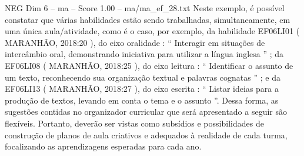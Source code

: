 \begin{textsample}{NEG Dim 6 – ma – Score 1.00 – ma/ma\_ef\_28.txt}
Neste exemplo, é possível constatar que várias habilidades estão sendo trabalhadas, simultaneamente, em uma única aula/atividade, como é o caso, por exemplo, da habilidade EF06LI01 ( MARANHÃO, 2018:20 ), do eixo oralidade : “ Interagir em situações de intercâmbio oral, demonstrando iniciativa para utilizar a língua inglesa ” ; da EF06LI08 ( MARANHÃO, 2018:25 ), do eixo leitura : “ Identificar o assunto de um texto, reconhecendo sua organização textual e palavras cognatas ” ; e da EF06LI13 ( MARANHÃO, 2018:27 ), do eixo escrita : “ Listar ideias para a produção de textos, levando em conta o tema e o assunto ”.
Dessa forma, as sugestões contidas no organizador curricular que será apresentado a seguir são flexíveis.
Portanto, deverão ser vistas como subsídios e possibilidades de construção de planos de aula criativos e adequados à realidade de cada turma, focalizando as aprendizagens esperadas para cada ano.

\end{textsample}
